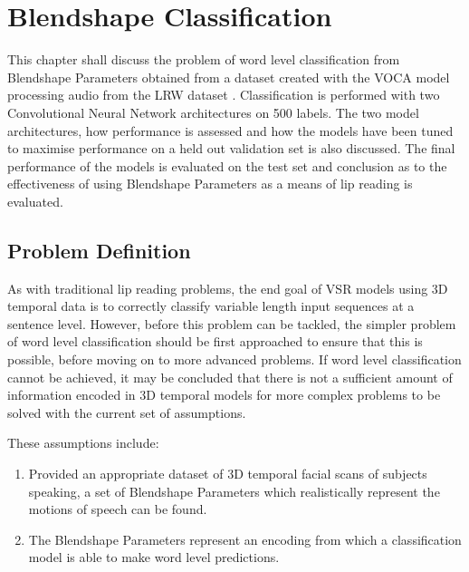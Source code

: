 



\chapter{Blendshape Classification}\label{chap:classification}

This chapter shall discuss the problem of word level classification from Blendshape Parameters obtained from a dataset created with the VOCA model \cite{Cudeiro2019} processing audio from the LRW dataset \cite{Chung2016}.
Classification is performed with two Convolutional Neural Network architectures on 500 labels.
The two model architectures, how performance is assessed and how the models have been tuned to maximise performance on a held out validation set is also discussed. 
The final performance of the models is evaluated on the test set and conclusion as to the effectiveness of using Blendshape Parameters as a means of lip reading is evaluated.

\section{Problem Definition}
As with traditional lip reading problems, the end goal of VSR models using 3D temporal data is to correctly classify variable length input sequences at a sentence level.
However, before this problem can be tackled, the simpler problem of word level classification should be first approached to ensure that this is possible, before moving on to more advanced problems.
If word level classification cannot be achieved, it may be concluded that there is not a sufficient amount of information encoded in 3D temporal models for more complex problems to be solved with the current set of assumptions.

These assumptions include:
\begin{enumerate}
    \item Provided an appropriate dataset of 3D temporal facial scans of subjects speaking, a set of Blendshape Parameters which realistically represent the motions of speech can be found. \label{assumption:class_1}
    \item The Blendshape Parameters represent an encoding from which a classification model is able to make word level predictions. \label{assumption:class_2}
\end{enumerate}

